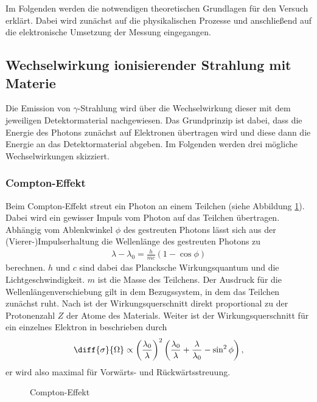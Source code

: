 Im Folgenden werden die notwendigen theoretischen Grundlagen für den Versuch erklärt. Dabei wird zunächst auf die physikalischen Prozesse und anschließend auf die elektronische Umsetzung der Messung eingegangen. 
\subsection{Wechselwirkung ionisierender Strahlung mit Materie}
Die Emission von $\gamma$-Strahlung wird über die Wechselwirkung dieser mit dem jeweiligen Detektormaterial nachgewiesen. Das Grundprinzip ist dabei, dass die Energie des Photons zunächst auf Elektronen übertragen wird und diese dann die Energie an das Detektormaterial abgeben. Im Folgenden werden drei mögliche Wechselwirkungen skizziert.
\subsubsection*{Compton-Effekt} 
Beim Compton-Effekt streut ein Photon an einem Teilchen (siehe Abbildung \ref{fig:compton}). Dabei wird ein gewisser Impuls vom Photon auf das Teilchen übertragen. Abhängig vom Ablenkwinkel $\phi$ des gestreuten Photons lässt sich aus der (Vierer-)Impulserhaltung die Wellenlänge des gestreuten Photons zu
\begin{align}
  \lambda-\lambda_0=\frac{h}{mc}(1-\cos \phi)
  \label{eq:compton}
\end{align} 
berechnen. $h$ und $c$ sind dabei das Plancksche Wirkungsquantum und die Lichtgeschwindigkeit. $m$ ist die Masse des Teilchens. Der Ausdruck für die Wellenlängenverschiebung gilt in dem Bezugssystem, in dem das Teilchen zunächst ruht. Nach \cite{wirkungsquerschnitt} ist der Wirkungsquerschnitt direkt proportional zu der Protonenzahl $Z$ der Atome des Materials. Weiter ist der Wirkungsquerschnitt für ein einzelnes Elektron in \cite{wirkungsquerschnitt} beschrieben durch 
\begin{align}
  \diff{\sigma}{\Omega} \propto \left( \frac{\lambda_0}{\lambda} \right)^2 \left( \frac{\lambda_0}{\lambda}+ \frac{\lambda}{\lambda_0}-\sin^2 \phi\right),
\label{eq:compton_cs}
\end{align} 
er wird also maximal für Vorwärts- und Rückwärtsstreuung.
\begin{figure}[h]
  \centering
  \caption{Compton-Effekt}
  \label{fig:compton}
\end{figure}

